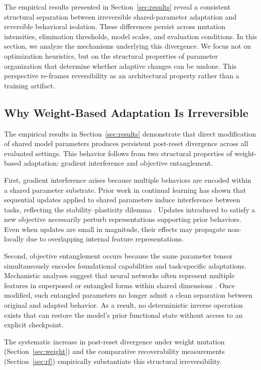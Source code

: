 \documentclass[10pt]{article}
\begin{document}
	The empirical results presented in Section~\ref{sec:results} reveal a consistent structural separation between irreversible shared-parameter adaptation and reversible behavioral isolation. These differences persist across mutation intensities, elimination thresholds, model scales, and evaluation conditions. In this section, we analyze the mechanisms underlying this divergence. We focus not on optimization heuristics, but on the structural properties of parameter organization that determine whether adaptive changes can be undone. This perspective re-frames reversibility as an architectural property rather than a training artifact.
	
	\subsection{Why Weight-Based Adaptation Is Irreversible}
	\label{sec:analysis_irreversibility}
	
	The empirical results in Section~\ref{sec:results} demonstrate that direct modification of shared model parameters produces persistent post-reset divergence across all evaluated settings. This behavior follows from two structural properties of weight-based adaptation: gradient interference and objective entanglement.
	
	First, gradient interference arises because multiple behaviors are encoded within a shared parameter substrate. Prior work in continual learning has shown that sequential updates applied to shared parameters induce interference between tasks, reflecting the stability--plasticity dilemma \cite{kirkpatrick2017ewc,delange2021continual}. Updates introduced to satisfy a new objective necessarily perturb representations supporting prior behaviors. Even when updates are small in magnitude, their effects may propagate non-locally due to overlapping internal feature representations.
	
	Second, objective entanglement occurs because the same parameter tensor simultaneously encodes foundational capabilities and task-specific adaptations. Mechanistic analyses suggest that neural networks often represent multiple features in superposed or entangled forms within shared dimensions \cite{elhage2022superposition}. Once modified, such entangled parameters no longer admit a clean separation between original and adapted behavior. As a result, no deterministic inverse operation exists that can restore the model’s prior functional state without access to an explicit checkpoint.
	
	The systematic increase in post-reset divergence under weight mutation (Section~\ref{sec:weight}) and the comparative recoverability measurements (Section~\ref{sec:rf}) empirically substantiate this structural irreversibility.
	
\end{document}

